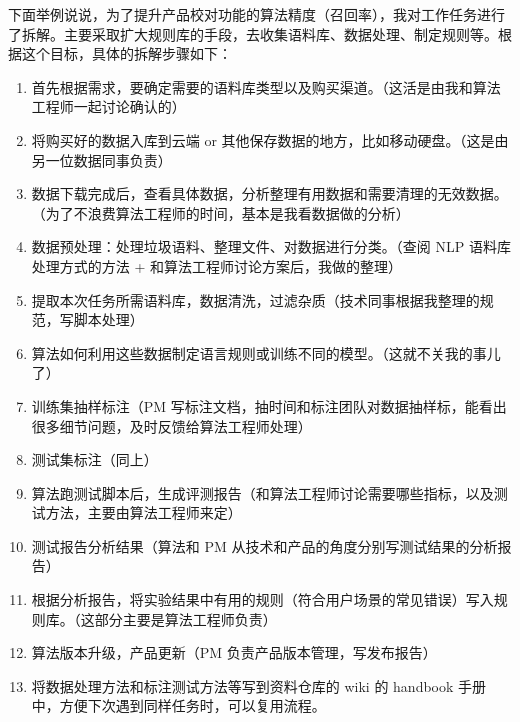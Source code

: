 \documentclass[letterpaper,10pt,english]{sphinxmanual}
\begin{document}
下面举例说说，为了提升产品校对功能的算法精度（召回率），我对工作任务进行了拆解。主要采取扩大规则库的手段，去收集语料库、数据处理、制定规则等。根据这个目标，具体的拆解步骤如下：
\begin{enumerate}
%
\item {} 
首先根据需求，要确定需要的语料库类型以及购买渠道。（这活是由我和算法工程师一起讨论确认的）

\item {} 
将购买好的数据入库到云端 or
其他保存数据的地方，比如移动硬盘。（这是由另一位数据同事负责）

\item {} 
数据下载完成后，查看具体数据，分析整理有用数据和需要清理的无效数据。（为了不浪费算法工程师的时间，基本是我看数据做的分析）

\item {} 
数据预处理：处理垃圾语料、整理文件、对数据进行分类。（查阅 NLP
语料库处理方式的方法 + 和算法工程师讨论方案后，我做的整理）

\item {} 
提取本次任务所需语料库，数据清洗，过滤杂质（技术同事根据我整理的规范，写脚本处理）

\item {} 
算法如何利用这些数据制定语言规则或训练不同的模型。（这就不关我的事儿了）

\item {} 
训练集抽样标注（PM
写标注文档，抽时间和标注团队对数据抽样标，能看出很多细节问题，及时反馈给算法工程师处理）

\item {} 
测试集标注（同上）

\item {} 
算法跑测试脚本后，生成评测报告（和算法工程师讨论需要哪些指标，以及测试方法，主要由算法工程师来定）

\item {} 
测试报告分析结果（算法和 PM
从技术和产品的角度分别写测试结果的分析报告）

\item {} 
根据分析报告，将实验结果中有用的规则（符合用户场景的常见错误）写入规则库。（这部分主要是算法工程师负责）

\item {} 
算法版本升级，产品更新（PM 负责产品版本管理，写发布报告）

\item {} 
将数据处理方法和标注\sphinxhyphen{}测试方法等写到资料仓库的 wiki 的 handbook
手册中，方便下次遇到同样任务时，可以复用流程。

\end{enumerate}
\end{document}
